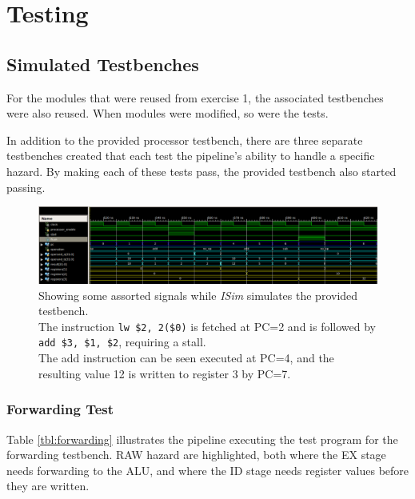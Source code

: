 \section{Testing}
\subsection{Simulated Testbenches}
For the modules that were reused from exercise 1,
the associated testbenches were also reused.
When modules were modified,
so were the tests.

In addition to the provided processor testbench,
there are three separate testbenches created that each test the pipeline's ability to handle a specific hazard.
By making each of these tests pass, the provided testbench also started passing.

\begin{figure}[h]
    \centering
    \includegraphics[width=\textwidth]{img/isim}
    \caption{Showing some assorted signals while \textit{ISim} simulates the provided testbench.\\
        The instruction \texttt{lw \$2, 2(\$0)} is fetched at PC=2 and is followed by \texttt{add \$3, \$1, \$2},
        requiring a stall.\\
        The add instruction can be seen executed at PC=4,
         and the resulting value 12 is written to register 3 by PC=7.
    }
    \label{fig:isim}
\end{figure}

\subsubsection{Forwarding Test}
Table \ref{tbl:forwarding} illustrates the pipeline executing the test program for the forwarding testbench.
RAW hazard are highlighted,
both where the EX stage needs forwarding to the ALU,
and where the ID stage needs register values before they are written.


